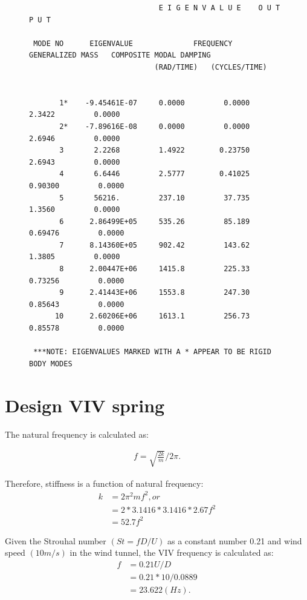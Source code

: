 \documentclass[paper=a4, fontsize=11pt]{scrartcl} %
\numberwithin{equation}{section} %
\numberwithin{figure}{section} %
\numberwithin{table}{section} %
\begin{document}
\newpage
\begin{figure}
\begin{verbatim}
                              E I G E N V A L U E    O U T P U T     

 MODE NO      EIGENVALUE              FREQUENCY         GENERALIZED MASS   COMPOSITE MODAL DAMPING            
                             (RAD/TIME)   (CYCLES/TIME)


       1*    -9.45461E-07     0.0000         0.0000         2.3422         0.0000    
       2*    -7.89616E-08     0.0000         0.0000         2.6946         0.0000    
       3       2.2268         1.4922        0.23750         2.6943         0.0000    
       4       6.6446         2.5777        0.41025        0.90300         0.0000    
       5       56216.         237.10         37.735         1.3560         0.0000    
       6      2.86499E+05     535.26         85.189        0.69476         0.0000    
       7      8.14360E+05     902.42         143.62         1.3805         0.0000    
       8      2.00447E+06     1415.8         225.33        0.73256         0.0000    
       9      2.41443E+06     1553.8         247.30        0.85643         0.0000    
      10      2.60206E+06     1613.1         256.73        0.85578         0.0000    

 ***NOTE: EIGENVALUES MARKED WITH A * APPEAR TO BE RIGID BODY MODES
\end{verbatim}
\end{figure}

\section{Design VIV spring}
\label{sec:design-viv-spring}

The natural frequency is calculated as:

\begin{align}
f = \sqrt{\frac{2k}{m}} / 2 \pi.
\end{align}

Therefore, stiffness is a function of natural frequency:
\begin{align}
  k &= 2 \pi^2 m f^2, or \\
    &=  2 * 3.1416 * 3.1416 * 2.67 f^2 \\
    &=  52.7 f^2
\end{align}

Given the Strouhal number $(St = f D/U)$ as a constant number 0.21 and
wind speed $(10 m/s)$ in the wind tunnel, the VIV frequency is
calculated as:
\begin{align}
  f &= 0.21 U /D \\
    &= 0.21 * 10 / 0.0889 \\
    &= 23.622 (Hz).
\end{align}
\end{document}
